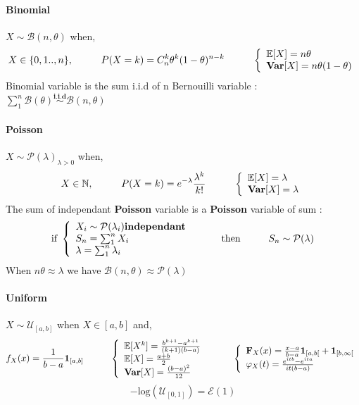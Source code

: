 \documentclass[a4paper,10pt]{article}
\begin{document}
\paragraph{Binomial} $X\sim \mathcal{B}(n,\theta)$ when,
\[
X \in \{0,1 .. , n\} , 
\hspace{10mm}
P(X=k)=C^k_n\theta ^k (1-\theta)^{n-k} 
\hspace{10mm}
\left\{
\begin{array}{l}
\mathbb{E}[X]=n\theta \\
\textbf{Var}[X]=n \theta (1-\theta) 
\end{array}\right.
\]
Binomial variable is the sum i.i.d of n Bernouilli variable : $\sum_1^n \mathcal{B}(\theta) \stackrel{\textbf{i.i.d}}{\sim}  \mathcal{B}(n,\theta) $

\paragraph{Poisson} $X\sim \mathcal{P}(\lambda)_{\lambda>0}$ when,
\[
X \in \mathbb{N} , 
\hspace{10mm}
P(X=k)= e^{-\lambda}\frac{\lambda^k}{k!}
\hspace{10mm}
\left\{
\begin{array}{l}
\mathbb{E}[X]=\lambda \\
\textbf{Var}[X]=\lambda
\end{array}\right.
\]
The sum of independant \textbf{Poisson} variable is a \textbf{Poisson} variable of sum :
\[
\text{if  } 
\left\{
\begin{array}{l}
X_i \sim \mathcal{P}(\lambda_i) \textbf{independant} \\
S_n = \sum_{1}^{n} X_i \\
\lambda = \sum_{1}^{n} \lambda_i
\end{array}\right.
\hspace{10mm} \text{then} \hspace{10mm}
S_n \sim \mathcal{P}(\lambda)
\]
When $n\theta \approx \lambda$ we have $\mathcal{B}(n,\theta) \approx \mathcal{P}(\lambda)$

\paragraph{Uniform} $X\sim \mathcal{U}_{[a,b]}$ when $X \in [a,b]$ and,
\[
f_{X}(x) = \frac{1}{b-a}\mathbf{1}_{[a,b]}
\hspace{10mm}
\left\{
\begin{array}{l}
\mathbb{E}[X^k]=\frac{b^{k+1}-a^{k+1}}{(k+1)(b-a)} \\
\mathbb{E}[X]=\frac{a+b}{2} \\
\textbf{Var}[X]=\frac{(b-a)^2}{12} 
\end{array}\right.
\hspace{10mm}
\left\{
\begin{array}{l}
\textbf{F}_X(x) = \frac{x-a}{b-a}\mathbf{1}_{[a,b[} + \mathbf{1}_{[b,\infty[} \\
\varphi_{X}(t) = \frac{e^{itb}-e^{ita}}{it(b-a)}
\end{array}\right.
\]
\[
-\text{log}(\mathcal{U}_{[0,1]}) = \mathcal{E}(1)
\]
\end{document}
